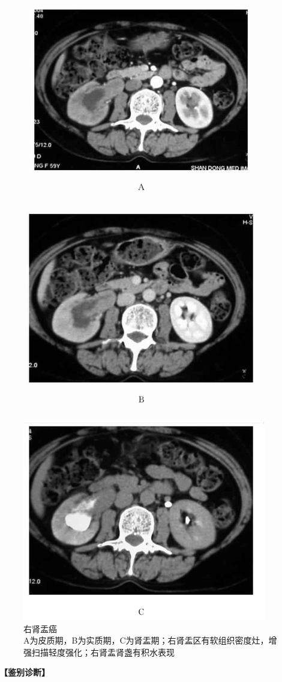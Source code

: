 \begin{figure}[!htbp]
 \centering
 \includegraphics[width=.7\textwidth,height=\textheight,keepaspectratio]{./images/Image00340.jpg}
 \captionsetup{justification=centering}
 \caption{右肾盂癌\\{\small A为皮质期，B为实质期，C为肾盂期；右肾盂区有软组织密度灶，增强扫描轻度强化；右肾盂肾盏有积水表现}}
 \label{fig15-23}
  \end{figure} 

\textbf{【鉴别诊断】}

